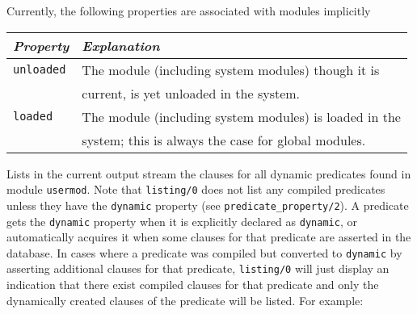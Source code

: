 \begin{description}
    Currently, the following properties are associated with modules 
    implicitly 

    \begin{center}
    \begin{tabular}{||l|l||}               \hline 
	{\em Property}		& {\em Explanation} \\ \hline \hline
	{\tt unloaded}		& 
		The module (including system modules) though it is \\
	&	current, is yet unloaded in the system. \\ \hline
	{\tt loaded}		& 
		The module (including system modules) is loaded in the \\
	&	system; this is always the case for global modules.\\ \hline
    \end{tabular}
    \end{center}

    Lists in the current output stream the clauses for all dynamic
    predicates found in module {\tt usermod}.  Note that {\tt listing/0}
    does not list any compiled predicates unless they have the
    {\tt dynamic} property (see {\tt predicate\_property/2}).  A
    predicate gets the {\tt dynamic} property when it is explicitly
    declared as {\tt dynamic}, or automatically acquires it when some
    clauses for that predicate are asserted in the database.  In
    cases where a predicate was compiled but converted to {\tt dynamic}
    by asserting additional clauses for that predicate, {\tt listing/0}
    will just display an indication that there exist compiled clauses
    for that predicate and only the dynamically created clauses of the
    predicate will be listed.  For example:



\end{description}
